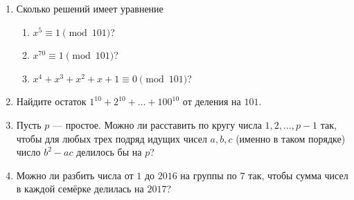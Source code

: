\documentclass{article}
\begin{document}
\begin{enumerate}[label*=\protect\fbox{\arabic{enumi}}]
	\item Сколько решений имеет уравнение
	\begin{enumerate}
		\item $x^5 \equiv 1 \pmod{101}$?
		\item $x^{70} \equiv 1 \pmod{101}$?
		\item $x^4 + x^3 + x^2 + x + 1 \equiv 0 \pmod{101}$?
	\end{enumerate}
	
	\item Найдите остаток $1^{10} + 2^{10} + \ldots + 100^{10}$ от деления на $101$.
	
	\item Пусть $p$ — простое. Можно ли расставить по кругу числа $1, 2, \ldots, p - 1$ так, чтобы для любых трех подряд идущих чисел $a, b, c$ (именно в таком порядке) число $b^2 - ac$ делилось бы на $p$?
	
	\item Можно ли разбить числа от $1$ до $2016$ на группы по $7$ так, чтобы сумма чисел в каждой семёрке делилась на $2017$?
	
\end{enumerate}
\end{document}
